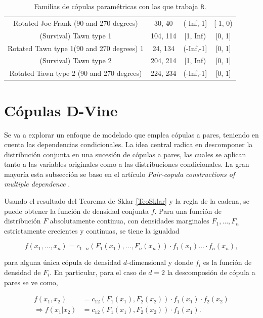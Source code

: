 \begin{table}[H]
\begin{tabular}{||c|c|c|c||}
Rotated Joe-Frank (90 and 270 degrees)	    & 30, 40	& (-Inf,-1] & [-1, 0)   \\
(Survival) Tawn type 1	                    & 104, 114	& [1, Inf)	& [0, 1]    \\
Rotated Tawn type 1(90 and 270 degrees)	1   & 24, 134	& (-Inf,-1]	& [0, 1]    \\
(Survival) Tawn type 2	                    & 204, 214	& [1, Inf)	& [0, 1]    \\ 
Rotated Tawn type 2 (90 and 270 degrees)	& 224, 234	& (-Inf,-1]	& [0, 1]    \\ \hline \hline
    \end{tabular}
    \caption{Familias de cópulas paramétricas con las que trabaja \texttt{R}.}
    \label{tab:family_set}
\end{table}


\section{Cópulas D-Vine}

Se va a explorar un enfoque de modelado que emplea cópulas a pares, teniendo en cuenta las dependencias condicionales. La idea central radica en descomponer la distribución conjunta en una sucesión de cópulas a pares, las cuales se aplican tanto a las variables originales como a las distribuciones condicionales. La gran mayoría esta subsección se baso en el artículo \textit{Pair-copula constructions of multiple dependence} \cite{PairCopula}.

Usando el resultado del Teorema de Sklar \ref{TeoSklar} y la regla de la cadena, se puede obtener la función de densidad conjunta $f$. Para una función de distribución $F$ absolutamente continua, con densidades marginales $F_1, \dots, F_n$ estrictamente crecientes y continuas, se tiene la igualdad

\begin{equation}\label{conjunta}
    f\left( x_1, \dots, x_n\right)=  c_{1 \cdots n} (F_1\left(x_1\right), \ldots, F_n\left(x_n\right) ) \cdot f_1\left(x_1\right) \dots \cdot f_n\left(x_n\right),
\end{equation}

para alguna única cópula de densidad $d$-dimensional y donde $f_i$ es la función de densidad de $F_i$. En particular, para el caso de $d = 2$ la descomposión de cópula a pares se ve como,

\begin{equation} \label{eq1}
    \begin{split}
        f (x_1, x_2) & = c_{12}(F_1(x_1), F_2(x_2)) \cdot f_1(x_1) \cdot f_2(x_2) \\
      \Rightarrow f\left(x_1 | x_2\right) & = c_{12}(F_1\left(x_1\right), F_2\left(x_2\right)) \cdot f_1\left(x_1\right).
    \end{split}
\end{equation}

